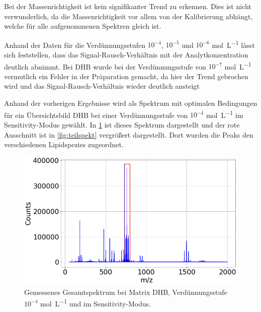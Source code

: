 Bei der Massenrichtigkeit ist kein signifikanter Trend zu erkennen.
Dies ist nicht verwunderlich, da die Massenrichtigkeit vor allem von der Kalibrierung abhängt, welche für alle aufgenommenen Spektren gleich ist.

Anhand der Daten für die Verdünnungsstufen $10^{-4}$, $10^{-5}$ und $10^{-6}$ \si{\mole \per \liter} lässt sich feststellen, dass das Signal-Rausch-Verhältnis mit der Analytkonzentration deutlich abnimmt.
Bei DHB wurde bei der Verdünnungsstufe von $10^{-7}$ \si{\mole \per \liter} vermutlich ein Fehler in der Präparation gemacht, da hier der Trend gebrochen wird und das Signal-Rausch-Verhältnis wieder deutlich ansteigt
\par

Anhand der vorherigen Ergebnisse wird als Spektrum mit optimalen Bedingungen für ein Übersichtsbild DHB bei einer Verdünnungsstufe von $10^{-4}$ \si{\mole \per \liter} im Sensitivity-Modus gewählt.
In \cref{fig_gesamtspekt} ist dieses Spektrum dargestellt und der rote Ausschnitt ist in \cref{fig:teilspekt} vergrößert dargestellt.
Dort wurden die Peaks den verschiedenen Lipidspezies zugeordnet.

\begin{figure}[!ht]
    \centering
    \includegraphics[width=1\textwidth]{img/overview-D02_Oben_S}
    \caption{Gemessenes Gesamtspektrum bei Matrix DHB, Verdünnungsstufe $10^{-4}$ \si{\mole \per \liter} und im Sensitivity-Modus.}
    \label{fig_gesamtspekt}
\end{figure}

